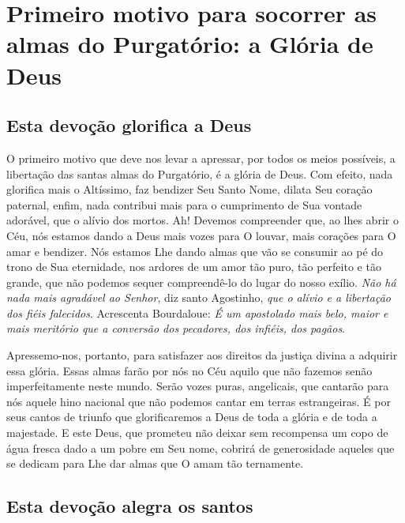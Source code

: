 \renewcommand{\thechapterdisplay}{Décimo sexto dia}
\renewcommand{\thechapterrunner}{Primeiro motivo: a Glória de Deus}
\chapter[Décimo sexto dia --- Primeiro motivo para socorrer as almas do Purgatório: a Glória de Deus]{Primeiro motivo para socorrer as almas do Purgatório: a Glória de Deus}
\section*{Esta devoção glorifica a Deus}

O primeiro motivo que deve nos levar a apressar, por todos os meios possíveis, a libertação das santas almas do Purgatório, é a glória de Deus. Com efeito, nada glorifica mais o Altíssimo, faz bendizer Seu Santo Nome, dilata Seu coração paternal, enfim, nada contribui mais para o cumprimento de Sua vontade adorável, que o alívio dos mortos. Ah! Devemos compreender que, ao lhes abrir o Céu, nós estamos dando a Deus mais vozes para O louvar, mais corações para O amar e bendizer. Nós estamos Lhe dando almas que vão se consumir ao pé do trono de Sua eternidade, nos ardores de um amor tão puro, tão perfeito e tão grande, que não podemos sequer compreendê-lo do lugar do nosso exílio. \textit{Não há nada mais agradável ao Senhor}, diz santo Agostinho, \textit{que o alívio e a libertação dos fiéis falecidos}. Acrescenta Bourdaloue: \textit{É um apostolado mais belo, maior e mais meritório que a conversão dos pecadores, dos infiéis, dos pagãos}.

Apressemo-nos, portanto, para satisfazer aos direitos da justiça divina a adquirir essa glória. Essas almas farão por nós no Céu aquilo que não fazemos senão imperfeitamente neste mundo. Serão vozes puras, angelicais, que cantarão para nós aquele hino nacional que não podemos cantar em terras estrangeiras. É por seus cantos de triunfo que glorificaremos a Deus de toda a glória e de toda a majestade. E este Deus, que prometeu não deixar sem recompensa um copo de água fresca dado a um pobre em Seu nome, cobrirá de generosidade aqueles que se dedicam para Lhe dar almas que O amam tão ternamente. 


\section*{Esta devoção alegra os santos}

